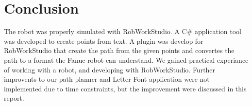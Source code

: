 \section{Conclusion}
\label{sec:conclusion}

The robot was properly simulated with RobWorkStudio. A C\# application tool was developed to create points from text. A plugin was develop for RobWorkStudio that create the path from the given points and convertes the path to a format the Fanuc robot can understand. We gained practical experiance of working with a robot, and developing with RobWorkStudio. Further improvents to our path planner and Letter Font application were not implemented due to time constraints, but the improvement were discussed in this report.
